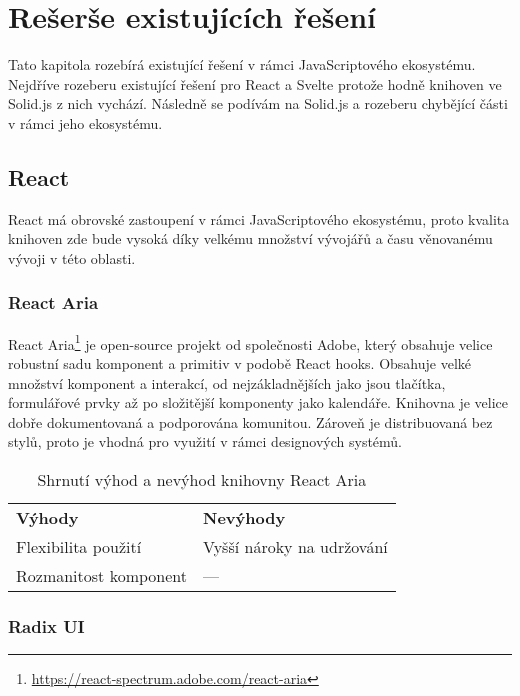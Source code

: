 \chapter{Rešerše existujících řešení}

Tato kapitola rozebírá existující řešení v rámci JavaScriptového ekosystému.
Nejdříve rozeberu existující řešení pro React a Svelte protože hodně knihoven ve Solid.js z nich vychází.
Následně se podívám na Solid.js a rozeberu chybějící části v rámci jeho ekosystému.

\section{React}

React má obrovské zastoupení v rámci JavaScriptového ekosystému, proto kvalita knihoven zde bude vysoká díky velkému množství vývojářů a času věnovanému vývoji v této oblasti.

\subsection{React Aria}

React Aria\footnote{\url{https://react-spectrum.adobe.com/react-aria}} je open-source projekt od společnosti Adobe, který obsahuje velice robustní sadu komponent a primitiv v podobě React hooks.
Obsahuje velké množství komponent a interakcí, od nejzákladnějších jako jsou tlačítka, formulářové prvky až po složitější komponenty jako kalendáře.
Knihovna je velice dobře dokumentovaná a podporována komunitou.
Zároveň je distribuovaná bez stylů, proto je vhodná pro využití v rámci designových systémů.

\begin{table}[ht]
    \begin{ctucolortab}
        \begin{tabularx}{\textwidth}{Y Y}
            \bfseries \textcolor{OK}{Výhody} & \bfseries \textcolor{NOT_OK}{Nevýhody} \\\Midrule{}
            Flexibilita použití              & Vyšší nároky na udržování              \\
            Rozmanitost komponent            & ---
        \end{tabularx}
    \end{ctucolortab}
    \caption{Shrnutí výhod a nevýhod knihovny React Aria}
\end{table}

\subsection{Radix UI}


